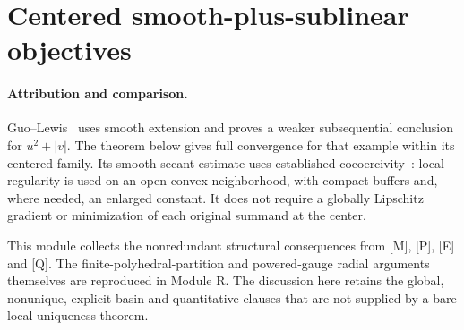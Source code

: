 \section{Centered smooth-plus-sublinear objectives}
\paragraph{Attribution and comparison.}
Guo--Lewis~\cite[Theorem~4.1 and Corollary~4.4]{GL18} uses smooth extension and proves a weaker subsequential conclusion for $u^2+|v|$. The theorem below gives full convergence for that example within its centered family. Its smooth secant estimate uses established cocoercivity~\cite[Theorem~2.5]{WW}: local regularity is used on an open convex neighborhood, with compact buffers and, where needed, an enlarged constant. It does not require a globally Lipschitz gradient or minimization of each original summand at the center.

This module collects the nonredundant structural consequences from [M], [P], [E] and [Q]. The finite-polyhedral-partition and powered-gauge radial arguments themselves are reproduced in Module R. The discussion here retains the global, nonunique, explicit-basin and quantitative clauses that are not supplied by a bare local uniqueness theorem.


